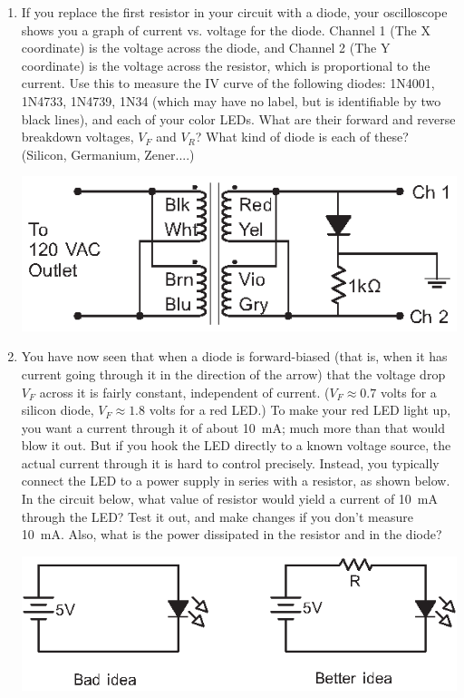 \begin{enumerate}[wide]
\item If you replace the first resistor in your circuit with a diode, your oscilloscope shows you a graph of current vs. voltage for the diode.  Channel 1 (The X coordinate) is the voltage across the diode, and Channel 2 (The Y coordinate) is the voltage across the resistor, which is proportional to the current.  Use this to measure the IV curve of the following diodes: 1N4001, 1N4733, 1N4739, 1N34 (which may have no label, but is identifiable by two black lines), and each of your color LEDs.  What are their forward and reverse breakdown voltages, $V_F$ and  $V_R$?  What kind of diode is each of these?  (Silicon, Germanium, Zener....) \label{part_measuring_diode_iv} \label{part_diode_measurements}
\vspace{-0.1in}
\begin{center}
\includegraphics{diodes/diode_testing_circuit_2.eps}
\end{center}

\item You have now seen that when a diode is forward-biased (that is, when it has current going through it in the direction of the arrow) that the voltage drop $V_F$ across it is fairly constant, independent of current.  ($V_F \approx 0.7$ volts for a silicon diode, $V_F \approx 1.8$ volts for a red LED.)  To make your red LED light up, you want a current through it of about 10~mA; much more than that would blow it out.  But if you hook the LED directly to a known voltage source, the actual current through it is hard to control precisely.  Instead, you typically connect the LED to a power supply in series with a resistor, as shown below.  In the circuit below, what value of resistor would yield a current of 10~mA through the LED?  Test it out, and make changes if you don't measure 10~mA.  Also, what is the power dissipated in the resistor and in the diode?
\vspace{-0.1in}
\begin{center}
\includegraphics{diodes/led_with_resistor.eps}
\end{center}


\end{enumerate}

